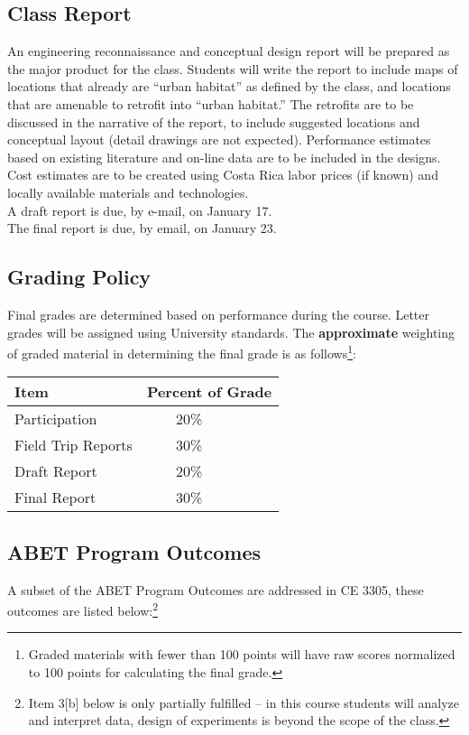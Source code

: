 \documentclass[12pt]{article}
\begin{document}
\subsection*{Class Report}
An engineering reconnaissance and conceptual design report will be prepared as the major product for the class.
Students will write the report to include maps of locations that already are ``urban habitat'' as defined by the class, and locations that are amenable to retrofit into ``urban habitat.''
The retrofits are to be discussed in the narrative of the report, to include suggested locations and conceptual layout (detail drawings are not expected). 
Performance estimates based on existing literature and on-line data are to be included in the designs.
Cost estimates are to be created using Costa Rica labor prices (if known) and locally available materials and technologies.\\

A draft report is due, by e-mail, on January 17.\\
The final report is due, by email, on January 23.   %
\subsection*{Grading Policy}
Final grades are determined based on performance during the course.
Letter grades will be assigned using University standards.  
The \textbf{approximate} weighting of graded material in determining the final grade is as follows\footnote{Graded materials with fewer than 100 points will have raw scores normalized to 100 points for calculating the final grade.}:

\begin{table}[h!]
   \centering
   \begin{tabular}{l l}
Item & Percent of Grade \\
\hline
\hline
Participation      & ~~~~20\% \\
Field Trip Reports        &  ~~~~30\% \\
Draft Report  & ~~~~20\% \\
Final Report  & ~~~~30\% \\
\hline
\end{tabular}
\end{table}
\clearpage
\subsection*{ABET Program Outcomes}
A subset of the ABET Program Outcomes are addressed in CE 3305, these outcomes are listed below:\footnote{Item 3[b] below is only partially fulfilled -- in this course students will analyze and interpret data, design of experiments is beyond the scope of the class.}
\end{document}
